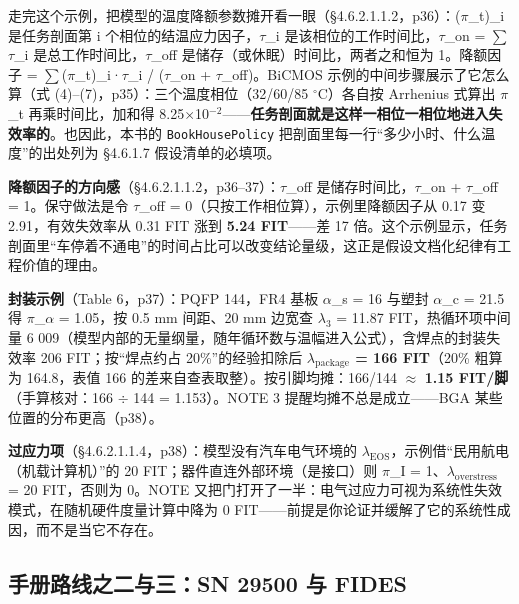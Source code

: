 走完这个示例，把模型的温度降额参数摊开看一眼（§4.6.2.1.1.2，p36）：(\(\pi\)\_t)\_i 是任务剖面第 i 个相位的结温应力因子，\(\tau\)\_i 是该相位的工作时间比，\(\tau\)\_on = \(\sum\)\(\tau\)\_i 是总工作时间比，\(\tau\)\_off 是储存（或休眠）时间比，两者之和恒为 1。降额因子 = \(\sum\)(\(\pi\)\_t)\_i·\(\tau\)\_i / (\(\tau\)\_on + \(\tau\)\_off)。BiCMOS 示例的中间步骤展示了它怎么算（式 (4)–(7)，p35）：三个温度相位（32/60/85 \(^{\circ}\)C）各自按 Arrhenius 式算出 \(\pi\)\_t 再乘时间比，加和得 8.25\(\times\)10\(^{-2}\)——\textbf{任务剖面就是这样一相位一相位地进入失效率的}。也因此，本书的 \nolinkurl{BookHousePolicy} 把剖面里每一行“多少小时、什么温度”的出处列为 §4.6.1.7 假设清单的必填项。

\textbf{降额因子的方向感}（§4.6.2.1.1.2，p36–37）：\(\tau\)\_off 是储存时间比，\(\tau\)\_on + \(\tau\)\_off = 1。保守做法是令 \(\tau\)\_off = 0（只按工作相位算），示例里降额因子从 0.17 变 2.91，有效失效率从 0.31 FIT 涨到 \textbf{5.24 FIT}——差 17 倍。这个示例显示，任务剖面里“车停着不通电”的时间占比可以改变结论量级，这正是假设文档化纪律有工程价值的理由。

\textbf{封装示例}（Table 6，p37）：PQFP 144，FR4 基板 \(\alpha\)\_s = 16 与塑封 \(\alpha\)\_c = 21.5 得 \(\pi\)\_\(\alpha\) = 1.05，按 0.5 mm 间距、20 mm 边宽查 \(\lambda\)\(_{3}\) = 11.87 FIT，热循环项中间量 6 009（模型内部的无量纲量，随年循环数与温幅进入公式），含焊点的封装失效率 206 FIT；按“焊点约占 20\%”的经验扣除后 \textbf{\(\lambda_{\mathrm{package}}\) = 166 FIT}（20\% 粗算为 164.8，表值 166 的差来自查表取整）。按引脚均摊：166/144 \(\approx\) \textbf{1.15 FIT/脚}（手算核对：166 \(\div\) 144 = 1.153）。NOTE 3 提醒均摊不总是成立——BGA 某些位置的分布更高（p38）。

\textbf{过应力项}（§4.6.2.1.1.4，p38）：模型没有汽车电气环境的 \(\lambda_{\mathrm{EOS}}\)，示例借“民用航电（机载计算机）”的 20 FIT；器件直连外部环境（是接口）则 \(\pi\)\_I = 1、\(\lambda_{\mathrm{overstress}}\) = 20 FIT，否则为 0。NOTE 又把门打开了一半：电气过应力可视为系统性失效模式，在随机硬件度量计算中降为 0 FIT——前提是你论证并缓解了它的系统性成因，而不是当它不存在。

\subsection{手册路线之二与三：SN 29500 与 FIDES}

